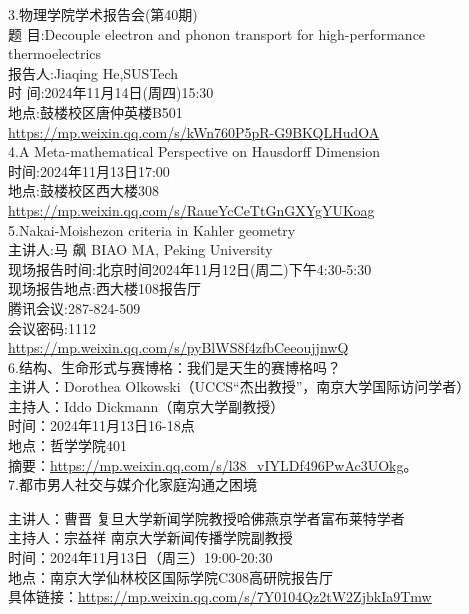 \documentclass[letterpaper, 12pt]{article}
\begin{document}
\begin{multicols}{2}
3.物理学院学术报告会(第40期)\\
题 目:Decouple electron and phonon transport for high-performance thermoelectrics\\
报告人:Jiaqing He,SUSTech\\
时 间:2024年11月14日(周四)15:30\\
地点:鼓楼校区唐仲英楼B501\\
\url{https://mp.weixin.qq.com/s/kWn760P5pR-G9BKQLHudOA}\\

4.A Meta-mathematical Perspective on Hausdorff Dimension\\
时间:2024年11月13日17:00\\
地点:鼓楼校区西大楼308\\
\url{https://mp.weixin.qq.com/s/RaueYcCeTtGnGXYgYUKoag}\\

5.Nakai-Moishezon criteria in Kahler geometry\\
主讲人:马 飙 BIAO MA, Peking University\\
现场报告时间:北京时间2024年11月12日(周二)下午4:30-5:30\\
现场报告地点:西大楼108报告厅\\
腾讯会议:287-824-509\\
会议密码:1112\\
\url{https://mp.weixin.qq.com/s/pyBlWS8f4zfbCeeoujjnwQ}\\

6.结构、生命形式与赛博格：我们是天生的赛博格吗？\\
主讲人：Dorothea Olkowski（UCCS“杰出教授”，南京大学国际访问学者）\\
主持人：Iddo Dickmann（南京大学副教授）\\
时间：2024年11月13日16-18点\\
地点：哲学学院401\\
摘要：\url{https://mp.weixin.qq.com/s/l38_vIYLDf496PwAc3UOkg}。\\

7.都市男人社交与媒介化家庭沟通之困境

主讲人：曹晋 复旦大学新闻学院教授哈佛燕京学者富布莱特学者\\
主持人：宗益祥 南京大学新闻传播学院副教授 \\
时间：2024年11月13日（周三）19:00-20:30\\
地点：南京大学仙林校区国际学院C308高研院报告厅\\
具体链接：\url{https://mp.weixin.qq.com/s/7Y0104Qz2tW2ZjbkIa9Tmw}\\



\end{multicols}
\end{document}
